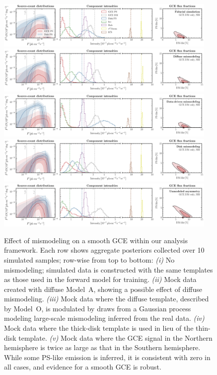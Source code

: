 \documentclass[prd,aps,10pt,nofootinbib,twocolumn,superscriptaddress,preprintnumbers,balancelastpage,longbibliography,floatfix]{revtex4-2}
\begin{document}
%
\begin{figure}[!htbp]
\centering
\includegraphics[width=0.95\textwidth]{plots/sim_sbi_dm_agg.pdf}
\includegraphics[width=0.95\textwidth]{plots/sim_sbi_modelA_dm.pdf}
\includegraphics[width=0.95\textwidth]{plots/sim_sbi_dm_mismo.pdf}
\includegraphics[width=0.95\textwidth]{plots/sim_sbi_thick_disk_mm_dm.pdf}
\includegraphics[width=0.95\textwidth]{plots/sim_sbi_dm_asym.pdf}
\caption{Effect of mismodeling on a smooth GCE within our analysis framework. Each row shows aggregate posteriors collected over 10 simulated samples; row-wise from top to bottom: \emph{(i)} No mismodeling; simulated data is constructed with the same templates as those used in the forward model for training. \emph{(ii)} Mock data created with diffuse {Model~A}, showing a possible effect of diffuse mismodeling. \emph{(iii)} Mock data where the diffuse template, described by {Model~O}, is modulated by draws from a Gaussian process modeling large-scale mismodeling inferred from the real \Fermi data. \emph{(iv)} Mock data where the thick-disk template is used in lieu of the thin-disk template. \emph{(v)} Mock data where the GCE signal in the Northern hemisphere is twice as large as that in the Southern hemisphere. While some PS-like emission is inferred, it is consistent with zero in all cases, and evidence for a smooth GCE is robust.}
\label{fig:sim_sbi_mismo}
\end{figure}
%
\end{document}
